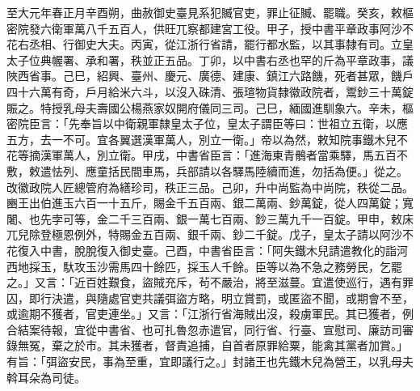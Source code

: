 \begin{pinyinscope}
 至大元年春正月辛酉朔，曲赦御史臺見系犯贓官吏，罪止征贓、罷職。癸亥，敕樞密院發六衛軍萬八千五百人，供旺兀察都建宮工役。甲子，授中書平章政事阿沙不花右丞相、行御史大夫。丙寅，從江浙行省請，罷行都水監，以其事隸有司。立皇太子位典幄署、承和署，秩並正五品。丁卯，以中書右丞也罕的斤為平章政事，議陜西省事。己巳，紹興、臺州、慶元、廣德、建康、鎮江六路饑，死者甚眾，饑戶四十六萬有奇，戶月給米六斗，以沒入硃清、張瑄物貨隸徽政院者，鬻鈔三十萬錠賑之。特授乳母夫壽國公楊燕家奴開府儀同三司。己巳，緬國進馴象六。辛未，樞密院臣言：「先奉旨以中衛親軍隸皇太子位，皇太子謂臣等曰：世祖立五衛，以應五方，去一不可。宜各翼選漢軍萬人，別立一衛。」帝以為然，敕知院事鐵木兒不花等摘漢軍萬人，別立衛。甲戌，中書省臣言：「進海東青鶻者當乘驛，馬五百不敷，敕遣怯列、應童括民間車馬，兵部請以各驛馬陸續而進，勿括為便。」從之。改徽政院人匠總管府為繕珍司，秩正三品。己卯，升中尚監為中尚院，秩從二品。豳王出伯進玉六百一十五斤，賜金千五百兩、銀二萬兩、鈔萬錠，從人四萬錠；寬闍、也先孛可等，金二千三百兩、銀一萬七百兩、鈔三萬九千一百錠。甲申，敕床兀兒除登極恩例外，特賜金五百兩、銀千兩、鈔二千錠。戊子，皇太子請以阿沙不花復入中書，脫脫復入御史臺。己酉，中書省臣言：「阿失鐵木兒請遣教化的詣河西地採玉，馱攻玉沙需馬四十餘匹，採玉人千餘。臣等以為不急之務勞民，乞罷之。」又言：「近百姓艱食，盜賊充斥，茍不嚴治，將至滋蔓。宜遣使巡行，遇有罪囚，即行決遣，與隨處官吏共議弭盜方略，明立賞罰，或匿盜不聞，或期會不至，或逾期不獲者，官吏連坐。」又言：「江浙行省海賊出沒，殺虜軍民。其已獲者，例合結案待報，宜從中書省、也可扎魯忽赤遣官，同行省、行臺、宣慰司、廉訪司審錄無冤，棄之於市。其未獲者，督責追捕，自首者原罪給粟，能禽其黨者加賞。」有旨：「弭盜安民，事為至重，宜即議行之。」封諸王也先鐵木兒為營王，以乳母夫斡耳朵為司徒。




\end{pinyinscope}
